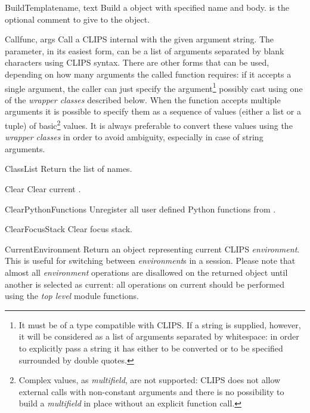\begin{funcdesc}{BuildTemplate}{name, text }
Build a  object with specified name and body.
 is the optional comment to give to the object.
\end{funcdesc}

\begin{funcdesc}{Call}{func, args}
Call a CLIPS internal  with the given argument string.
The  parameter, in its easiest form, can be a list of arguments
separated by blank characters using CLIPS syntax. There are other forms
that can be used, depending on how many arguments the called function
requires: if it accepts a single argument, the caller can just specify
the argument\footnote{It must be of a type compatible with CLIPS. If a
string is supplied, however, it will be considered as a list of arguments
separated by whitespace: in order to explicitly pass a string it has
either to be converted or to be specified surrounded by double quotes.}
possibly cast using one of the \emph{wrapper classes} described below. When
the function accepts multiple arguments it is possible to specify them
as a sequence of values (either a list or a tuple) of basic\footnote{Complex
values, as \emph{multifield}, are not supported: CLIPS does not allow
external calls with non-constant arguments and there is no possibility
to build a \emph{multifield} in place without an explicit function call.}
values. It is always preferable to convert these values using the
\emph{wrapper classes} in order to avoid ambiguity, especially in case of
string arguments.
\end{funcdesc}

\begin{funcdesc}{ClassList}{}
Return the list of  names.
\end{funcdesc}

\begin{funcdesc}{Clear}{}
Clear current .
\end{funcdesc}

\begin{funcdesc}{ClearPythonFunctions}{}
Unregister all user defined Python functions from \pyclips{}.
\end{funcdesc}

\begin{funcdesc}{ClearFocusStack}{}
Clear focus stack.
\end{funcdesc}

\begin{funcdesc}{CurrentEnvironment}{}
Return an  object representing current CLIPS
\emph{environment}. This is useful for switching between \emph{environment}s
in a \pyclips{} session. Please note that almost all \emph{environment}
operations are disallowed on the returned object until another
 is selected as current: all operations on current
 should be performed using the \emph{top level}
module functions.
\end{funcdesc}

